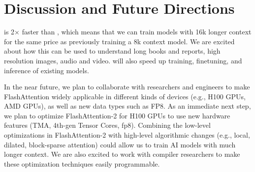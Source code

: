 \section{Discussion and Future Directions}
\label{sec:discussion}


\sysname is 2$\times$ faster than \sysnameone, which means that we can train models
with 16k longer context for the same price as previously training a 8k context
model.
We are excited about how this can be used to understand long books and reports,
high resolution images, audio and video.
\sysname will also speed up training, finetuning, and inference of
existing models.

In the near future, we plan to collaborate with researchers and engineers to
make FlashAttention widely applicable in different kinds of devices (e.g., H100
GPUs, AMD GPUs), as well as new data types such as FP8.
As an immediate next step, we plan to optimize FlashAttention-2 for H100 GPUs to
use new hardware features (TMA, 4th-gen Tensor Cores, fp8).
Combining the low-level optimizations in FlashAttention-2 with high-level
algorithmic changes (e.g., local, dilated, block-sparse attention) could allow
us to train AI models with much longer context.
We are also excited to work with compiler researchers to make these optimization
techniques easily programmable.



